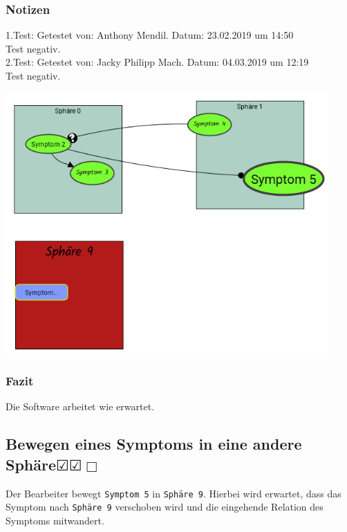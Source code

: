 \documentclass[enabledeprecatedfontcommands]{scrartcl}
\newcommand{\subsectiont}[2]{\subsection[#1]{#1{\normalsize\normalfont #2}}}
\newcommand{\leer}{$\Box$}
\newcommand{\ok}{$\CheckedBox$}
\begin{document}
\subsubsection{Notizen}
1.Test: Getestet von: Anthony Mendil. Datum: 23.02.2019 um 14:50 \\
Test negativ.\\
2.Test: Getestet von: Jacky Philipp Mach. Datum: 04.03.2019 um 12:19 \\
Test negativ.
\begin{center}
\includegraphics[height=10cm]{2_30.PNG}
\end{center}
\subsubsection{Fazit}
Die Software arbeitet wie erwartet.

\subsectiont{Bewegen eines Symptoms in eine andere Sphäre}{\dotfill\ok\ok\leer}
Der Bearbeiter bewegt \texttt{Symptom 5} in \texttt{Sphäre 9}. Hierbei wird erwartet, dass das Symptom nach \texttt{Sphäre 9} verschoben wird und die eingehende Relation des Symptoms mitwandert. 
\end{document}
